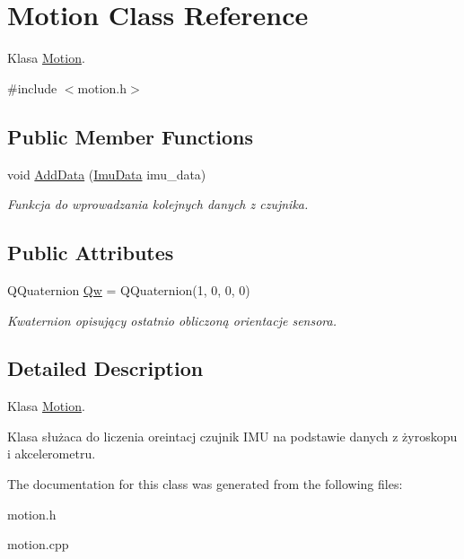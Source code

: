 \hypertarget{class_motion}{}\section{Motion Class Reference}
\label{class_motion}


Klasa \mbox{\hyperlink{class_motion}{Motion}}.  




{\ttfamily \#include $<$motion.\+h$>$}

\subsection*{Public Member Functions}
\begin{DoxyCompactItemize}
\item 
\mbox{\label{class_motion_a8b9a44728210e5c49f3157590a6f4e2c}} 
void \mbox{\hyperlink{class_motion_a8b9a44728210e5c49f3157590a6f4e2c}{Add\+Data}} (\mbox{\hyperlink{struct_imu_data}{Imu\+Data}} imu\+\_\+data)
\begin{DoxyCompactList}\small\item\em Funkcja do wprowadzania kolejnych danych z czujnika. \end{DoxyCompactList}\end{DoxyCompactItemize}
\subsection*{Public Attributes}
\begin{DoxyCompactItemize}
\item 
\mbox{\label{class_motion_aa1818f0ef203ea4bc2bf5eeb5cd406cb}} 
Q\+Quaternion \mbox{\hyperlink{class_motion_aa1818f0ef203ea4bc2bf5eeb5cd406cb}{Qw}} = Q\+Quaternion(1, 0, 0, 0)
\begin{DoxyCompactList}\small\item\em Kwaternion opisujący ostatnio obliczoną orientacje sensora. \end{DoxyCompactList}\end{DoxyCompactItemize}


\subsection{Detailed Description}
Klasa \mbox{\hyperlink{class_motion}{Motion}}. 

Klasa służaca do liczenia oreintacj czujnik I\+MU na podstawie danych z żyroskopu i akcelerometru. 

The documentation for this class was generated from the following files\+:\begin{DoxyCompactItemize}
\item 
motion.\+h\item 
motion.\+cpp\end{DoxyCompactItemize}
